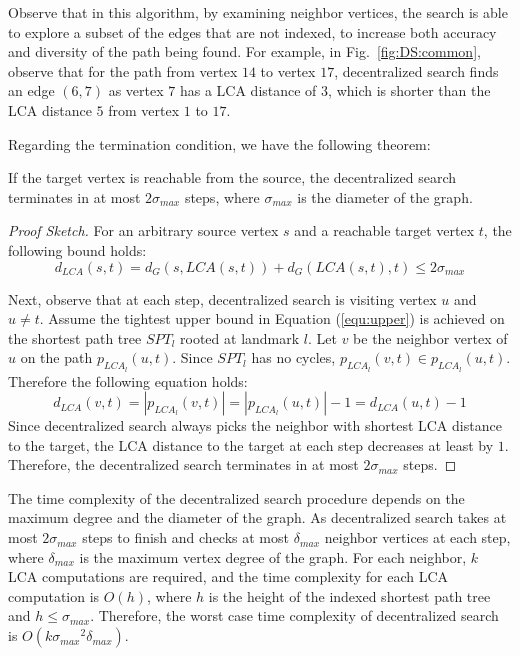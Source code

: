 Observe that in this algorithm, by examining neighbor vertices, the search is able to explore a subset of the edges that are not indexed, to increase both accuracy and diversity of the path being found. For example, in Fig.~\ref{fig:DS:common}, observe that for the path from vertex $14$ to vertex $17$, decentralized search finds an edge $(6, 7)$ as vertex $7$ has a LCA distance of $3$, which is shorter than the LCA distance $5$ from vertex $1$ to $17$.

Regarding the termination condition, we have the following theorem:

\begin{theorem}
\label{theorem:max_step}
If the target vertex is reachable from the source, the decentralized search terminates in at most $2{\sigma}_{max}$ steps, where ${\sigma}_{max}$ is the diameter of the graph.
\end{theorem}
\begin{proof}[Proof Sketch]
For an arbitrary source vertex $s$ and a reachable target vertex $t$, the following bound holds:
\[
    d_{LCA}(s,t) = d_G(s,LCA(s,t)) + d_G(LCA(s,t),t) \leq 2{\sigma}_{max}
\]

Next, observe that at each step, decentralized search is visiting vertex $u$ and $u \neq t$. Assume the tightest upper bound in Equation (\ref{equ:upper}) is achieved on the shortest path tree $SPT_l$ rooted at landmark $l$. Let $v$ be the neighbor vertex of $u$ on the path $p_{LCA_l}(u,t)$. Since $SPT_l$ has no cycles, $p_{LCA_l}(v,t) \in p_{LCA_l}(u,t)$. Therefore the following equation holds:
\[
		d_{LCA}(v,t) = |p_{LCA_l}(v,t)| = |p_{LCA_l}(u,t)| - 1 = d_{LCA}(u,t) - 1
\]
Since decentralized search always picks the neighbor with shortest LCA distance to the target, the LCA distance to the target at each step decreases at least by $1$. Therefore, the decentralized search terminates in at most $2{\sigma}_{max}$ steps.
\end{proof}

The time complexity of the decentralized search procedure depends on the maximum degree and the diameter of the graph. As decentralized search takes at most $2{\sigma}_{max}$ steps to finish and checks at most ${\delta}_{max}$ neighbor vertices at each step, where ${\delta}_{max}$ is the maximum vertex degree of the graph. For each neighbor, $k$ LCA computations are required, and the time complexity for each LCA computation is $O(h)$,
where $h$ is the height of the indexed shortest path tree and $h \leq {\sigma}_{max}$. Therefore, the worst case time complexity of decentralized search is $O(k{{\sigma}_{max}}^2{\delta}_{max})$. 

